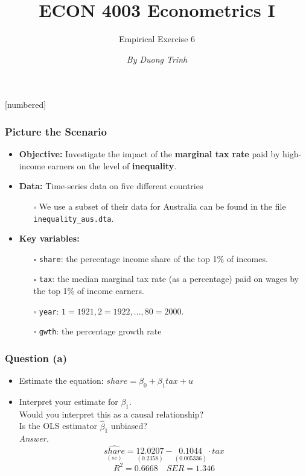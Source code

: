 \documentclass[11pt, xcolor=x11names,compress]{beamer}
\title [ECON 4003: Empirical Exercise 6]{ECON 4003 Econometrics I}
\author[]{Empirical Exercise 6}
\date[]{\textit{By Duong Trinh}}
\begin{document}
[numbered]
{
\frame{\titlepage}}
\linespread{1.15}

\begin{frame}[fragile,t]
\linespread{1.3}
\frametitle{Picture the Scenario}
\begin{itemize}
    \item \textbf{Objective:} Investigate the impact of the \textbf{marginal tax rate} paid by high-income earners on the level of \textbf{inequality}.
    \item \textbf{Data:} Time-series data on five different countries
    \begin{itemize}
        \item[$\square$] We use a subset of their data for Australia can be found in the file \texttt{inequality\_aus.dta}.
    \end{itemize}
    \item \textbf{Key variables:}
    \begin{itemize}
        \item[$\square$] \texttt{share}: the percentage income share
of the top 1\% of incomes.
        \item[$\square$] \texttt{tax}: the median marginal tax rate (as a percentage) paid on wages by the top 1\% of income earners.
        \item[$\square$] \texttt{year}: $1 = 1921, 2 = 1922, ... , 80 = 2000$.
        \item[$\square$] \texttt{gwth}: the percentage growth rate
    \end{itemize}
\end{itemize}
\end{frame}

\begin{frame}
\frametitle{Question (a)}
\begin{itemize}
    \item Estimate the equation: $share = \beta_0 + \beta_1tax + u$
    \item Interpret your estimate for $\beta_1$.\\
    Would you interpret this as a causal relationship?\\
    Is the OLS estimator $\widehat{\beta}_1$ unbiased?\\
\pause
\vspace{10mm}
\textit{Answer.}\\
\begin{equation*}
    \underset{(se)}{\widehat{share}} = \underset{(0.2358)}{12.0207} - \underset{(0.005336)}{0.1044} \cdot tax
\end{equation*}
\begin{equation*}
    R^2=0.6668 \quad SER=1.346
\end{equation*}
\end{itemize}
\end{frame}
\end{document}
